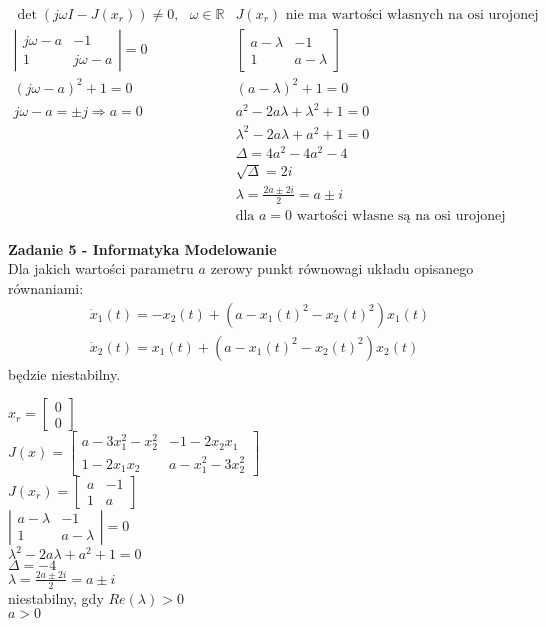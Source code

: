 \documentclass[a4paper,11pt]{article}
\begin{document}
$\begin{array}{ll}
\det(j\omega I-J(x_r)) \neq 0, \ \ \ \omega \in \mathbb{R} & J(x_r)\text{ nie ma wartości własnych na osi urojonej}\\
 \left| \begin{array}{cc}     j\omega-a& -1 \\ 1 & j\omega-a    \end{array}\right|=0 &  \left[ \begin{array}{cc}    a-\lambda & -1 \\ 1 & a- \lambda   \end{array}\right]\\
(j\omega-a)^2+1=0 & (a-\lambda)^2+1=0\\
j\omega-a= \pm j \Rightarrow \boxed{ a=0} & a^2-2a\lambda +\lambda^2+1 =0\\
&\lambda^2-2a\lambda+a^2+1 = 0\\
&\Delta=4a^2-4a^2-4\\
&\sqrt{\Delta}=2i\\
&\lambda=\frac{2a \pm 2i}{2} = a \pm i\\
&\text{dla } a=0 \text{ wartości własne są na osi urojonej}
\end{array}$\\



\newpage
\begin{framed}
\textbf{Zadanie 5 - Informatyka Modelowanie } \\ 
Dla jakich wartości parametru \( a \) zerowy punkt równowagi układu opisanego równaniami:
\begin{align*}
\dot{x}_{1}(t)=-x_{2}(t)+(a-x_{1}(t)^{2}-x_{2}(t)^{2})x_{1}(t) \\
\dot{x}_{2}(t)=x_{1}(t)+(a-x_{1}(t)^{2}-x_{2}(t)^{2})x_{2}(t)
\end{align*}
będzie niestabilny.
\end{framed}
$x_r=\left[ \begin{array}{c}     0\\0   \end{array}\right]$\\
$J(x)=\left[ \begin{array}{cc}   a-3x_1^2-x_2^2 & -1-2x_2x_1 \\ 1-2x_1x_2 & a-x_1^2-3x_2^2    \end{array}\right]$\\
$J(x_r)=\left[ \begin{array}{cc}    a & -1 \\ 1 & a    \end{array}\right]$\\
$\left| \begin{array}{cc}     a-\lambda & -1 \\ 1 & a-\lambda   \end{array}\right|=0$\\
$\lambda^2-2a\lambda+a^2+1=0$\\
$\Delta=-4$\\
$\lambda = \frac{2a \pm 2i}{2}=a \pm i$\\
niestabilny, gdy $Re(\lambda)>0$\\
$a>0$\\
\end{document}
